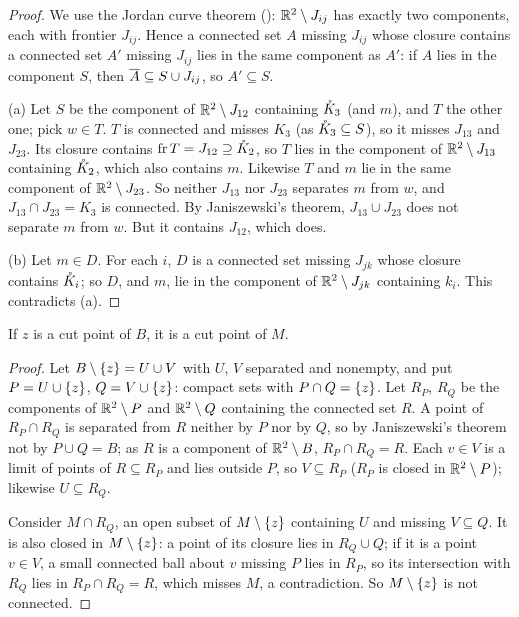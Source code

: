 \begin{proof}
We use the Jordan curve theorem (): $\mathbb{R}^2\setminus J_{ij}$ has exactly two components, each with frontier $J_{ij}$. Hence a connected set $A$ missing $J_{ij}$ whose closure contains a
connected set $A'$ missing $J_{ij}$ lies in the same component as $A'$: if $A$ lies in the component $S$, then $\overline{A}\subseteq S\cup J_{ij}$, so $A'\subseteq S$.

(a) Let $S$ be the component of $\mathbb{R}^2\setminus J_{12}$ containing $\mathring{K}_3$ (and $m$), and $T$ the other one; pick $w\in T$. $T$ is connected and misses $K_3$ (as $\mathring{K}_3\subseteq S$), so it misses $J_{13}$ and $J_{23}$. Its
closure contains $\operatorname{fr} T=J_{12}\supseteq\mathring{K}_2$, so $T$ lies in the component of $\mathbb{R}^2\setminus J_{13}$ containing $\mathring{K}_2$, which also contains $m$. Likewise $T$ and $m$ lie in the same component of
$\mathbb{R}^2\setminus J_{23}$. So neither $J_{13}$ nor $J_{23}$ separates $m$ from $w$, and $J_{13}\cap J_{23}=K_3$ is connected. By Janiszewski's theorem, $J_{13}\cup J_{23}$ does not separate $m$ from $w$. But it contains
$J_{12}$, which does.

(b) Let $m\in D$. For each $i$, $D$ is a connected set missing $J_{jk}$ whose closure contains $\mathring{K}_i$; so $D$, and $m$, lie in the component of $\mathbb{R}^2\setminus J_{jk}$ containing $k_i$. This contradicts (a).
\end{proof}


\begin{lemma}\label{lem:frontier-cyclic}
If $z$ is a cut point of $B$, it is a cut point of $M$.
\end{lemma}

\begin{proof}
Let $B\setminus\left\{ z \right\}=U\cup V$ with $U$, $V$ separated and nonempty, and put $P=U\cup\left\{ z \right\}$, $Q=V\cup\left\{ z \right\}$: compact sets with $P\cap Q=\left\{ z \right\}$. Let $R_P$, $R_Q$ be the components of $\mathbb{R}^2\setminus P$ and
$\mathbb{R}^2\setminus Q$ containing the connected set $R$. A point of $R_P\cap R_Q$ is separated from $R$ neither by $P$ nor by $Q$, so by Janiszewski's theorem not by $P\cup Q=B$; as $R$ is a component of $\mathbb{R}^2\setminus B$,
$R_P\cap R_Q=R$. Each $v\in V$ is a limit of points of $R\subseteq R_P$ and lies outside $P$, so $V\subseteq R_P$ ($R_P$ is closed in $\mathbb{R}^2\setminus P$); likewise $U\subseteq R_Q$.

Consider $M\cap R_Q$, an open subset of $M\setminus\left\{ z \right\}$ containing $U$ and missing $V\subseteq Q$. It is also closed in $M\setminus\left\{ z \right\}$: a point of its closure lies in $R_Q\cup Q$; if it is a point $v\in V$, a small
connected ball about $v$ missing $P$ lies in $R_P$, so its intersection with $R_Q$ lies in $R_P\cap R_Q=R$, which misses $M$, a contradiction. So $M\setminus\left\{ z \right\}$ is not connected.
\end{proof}

